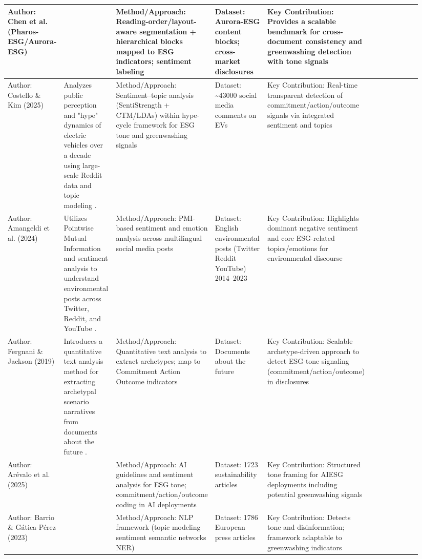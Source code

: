 \documentclass{article}
\begin{document}
\begin{landscape}
\begin{longtable}{p{0.134\linewidth} p{0.134\linewidth} p{0.134\linewidth} p{0.134\linewidth} p{0.134\linewidth} p{0.134\linewidth} p{0.134\linewidth}}
Author: Chen et al. (Pharos-ESG/Aurora-ESG) & ~ & Method/Approach: Reading-order/layout-aware segmentation + hierarchical blocks mapped to ESG indicators; sentiment labeling & Dataset: Aurora-ESG content blocks; cross-market disclosures & Key Contribution: Provides a scalable benchmark for cross-document consistency and greenwashing detection with tone signals & ~ & ~ \\ \hline
Author: Costello \& Kim (2025) & Analyzes public perception and "hype" dynamics of electric vehicles over a decade using large-scale Reddit data and topic modeling  \parencite{tao_ruan_824a9480}. & Method/Approach: Sentiment–topic analysis (SentiStrength + CTM/LDAs) within hype-cycle framework for ESG tone and greenwashing signals & Dataset: \textasciitilde{}43000 social media comments on EVs & Key Contribution: Real-time transparent detection of commitment/action/outcome signals via integrated sentiment and topics & ~ & ~ \\ \hline
Author: Amangeldi et al. (2024) & Utilizes Pointwise Mutual Information and sentiment analysis to understand environmental posts across Twitter, Reddit, and YouTube  \parencite{daniyar_amangeldi_dfc2f315}. & Method/Approach: PMI-based sentiment and emotion analysis across multilingual social media posts & Dataset: English environmental posts (Twitter Reddit YouTube) 2014–2023 & Key Contribution: Highlights dominant negative sentiment and core ESG-related topics/emotions for environmental discourse & ~ & ~ \\ \hline
Author: Fergnani \& Jackson (2019) & Introduces a quantitative text analysis method for extracting archetypal scenario narratives from documents about the future  \parencite{alessandro_fergnani_2dcaa903}. & Method/Approach: Quantitative text analysis to extract archetypes; map to Commitment Action Outcome indicators & Dataset: Documents about the future & Key Contribution: Scalable archetype-driven approach to detect ESG-tone signaling (commitment/action/outcome) in disclosures & ~ & ~ \\ \hline
Author: Arévalo et al. (2025) & ~ & Method/Approach: AI guidelines and sentiment analysis for ESG tone; commitment/action/outcome coding in AI deployments & Dataset: 1723 sustainability articles & Key Contribution: Structured tone framing for AIESG deployments including potential greenwashing signals & ~ & ~ \\ \hline
Author: Barrio \& Gática-Pérez (2023) & ~ & Method/Approach: NLP framework (topic modeling sentiment semantic networks NER) & Dataset: 1786 European press articles & Key Contribution: Detects tone and disinformation; framework adaptable to greenwashing indicators & ~ & ~ \\ \hline

\end{longtable}
\end{landscape}
\end{document}

